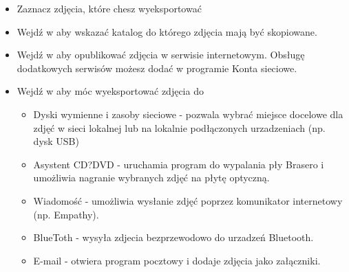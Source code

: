 \begin{itemize}
\item Zaznacz zdjęcia, które chesz wyeksportować
\item Wejdź w  aby wskazać katalog do którego zdjęcia mają być skopiowane.
\item Wejdź w  aby opublikować zdjęcia w serwisie internetowym. Obsługę dodatkowych serwisów możesz dodać w programie \textcolor{ubuntu_orange}{Konta sieciowe}.
\item Wejdź w  aby móc wyeksportować zdjęcia do
	\begin{itemize}
	\item \textcolor{ubuntu_orange}{Dyski wymienne i zasoby sieciowe} - pozwala wybrać miejsce docelowe dla zdjęć w sieci lokalnej lub na lokalnie podłączonych urzadzeniach (np. dysk USB)
	\item \textcolor{ubuntu_orange}{Asystent CD?DVD} - uruchamia program do wypalania pły Brasero i umożliwia nagranie wybranych zdjęć na płytę optyczną.
	\item \textcolor{ubuntu_orange}{Wiadomość} - umożliwia wysłanie zdjęć poprzez komunikator internetowy (np. Empathy).
	\item \textcolor{ubuntu_orange}{BlueToth} - wysyła zdjecia bezprzewodowo do urzadzeń Bluetooth.
	\item \textcolor{ubuntu_orange}{E-mail} - otwiera program pocztowy i dodaje zdjęcia jako załączniki.
	\end{itemize}	
\end{itemize}

